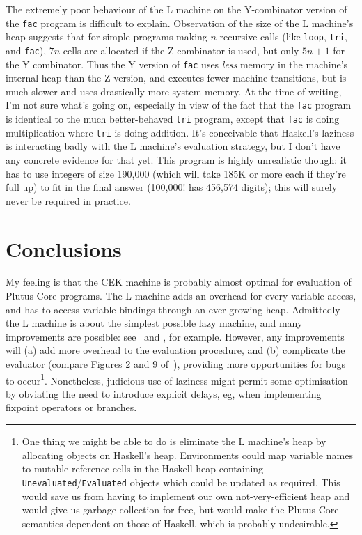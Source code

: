 \documentclass[a4paper]{article}
\begin{document}
The extremely poor behaviour of the L machine on the Y-combinator
version of the \texttt{fac} program is difficult to explain.
Observation of the size of the L machine's heap suggests that for
simple programs making $n$ recursive calls (like \texttt{loop},
\texttt{tri}, and \texttt{fac}), $7n$ cells are allocated if the Z
combinator is used, but only $5n+1$ for the Y combinator.  Thus the Y
version of \texttt{fac} uses \textit{less} memory in the machine's
internal heap than the Z version, and executes fewer machine
transitions, but is much slower and uses drastically more system
memory.  At the time of writing, I'm not sure what's going on,
especially in view of the fact that the \texttt{fac} program is
identical to the much better-behaved \texttt{tri} program, except that
\texttt{fac} is doing multiplication where \texttt{tri} is doing
addition.  It's conceivable that Haskell's laziness is interacting badly
with the L machine's evaluation strategy, but I don't have any
concrete evidence for that yet.  This program is highly unrealistic
though: it has to use integers of size 190,000 (which will take 185K
or more each if they're full up) to fit in the final answer (100,000!
has 456,574 digits); this will surely never be required in practice.

\section{Conclusions}
My feeling is that the CEK machine is probably almost optimal for
evaluation of Plutus Core programs.  The L machine adds an overhead
for every variable access, and has to access variable bindings through
an ever-growing heap.  Admittedly the L machine is about the simplest
possible lazy machine, and many improvements are possible:
see~\cite{Sestoft} and \cite{Friedman}, for example.  However, any
improvements will (a) add more overhead to the evaluation procedure,
and (b) complicate the evaluator (compare Figures 2 and 9
of~\cite{Friedman}), providing more opportunities for bugs to 
occur\footnote{
  One thing we might be able to do is eliminate the L
  machine's heap by allocating objects on Haskell's heap.
  Environments could map variable names to mutable reference cells in
  the Haskell heap containing \texttt{Unevaluated}/\texttt{Evaluated}
  objects which could be updated as required. This would save us from
  having to implement our own not-very-efficient heap and would give
  us garbage collection for free, but would make the Plutus Core
  semantics dependent on those of Haskell, which is probably
  undesirable.}.
Nonetheless, judicious use of laziness might permit some optimisation
by obviating the need to introduce explicit delays, eg, when
implementing fixpoint operators or branches.
\end{document}
